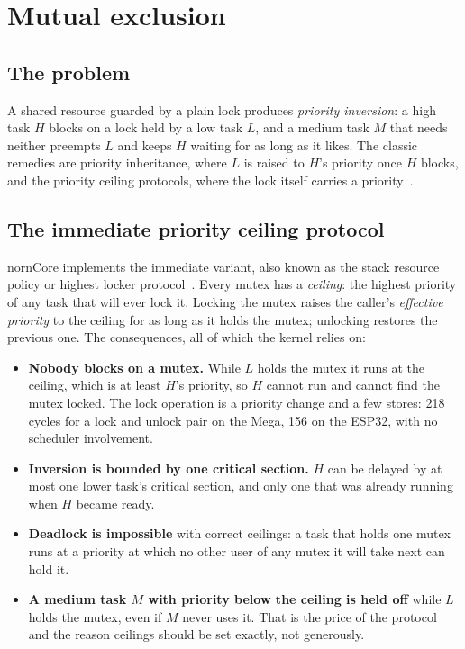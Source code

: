 \section{Mutual exclusion}
\label{sec:mutex}

\subsection{The problem}

A shared resource guarded by a plain lock produces \emph{priority inversion}: a high task
$H$ blocks on a lock held by a low task $L$, and a medium task $M$ that needs neither
preempts $L$ and keeps $H$ waiting for as long as it likes. The classic remedies are
priority inheritance, where $L$ is raised to $H$'s priority once $H$ blocks, and the
priority ceiling protocols, where the lock itself carries a priority~\cite{shaetal}.

\subsection{The immediate priority ceiling protocol}

nornCore implements the immediate variant, also known as the stack resource policy or
highest locker protocol~\cite{baker,burnswellings}. Every mutex has a \emph{ceiling}: the
highest priority of any task that will ever lock it. Locking the mutex raises the
caller's \emph{effective priority} to the ceiling for as long as it holds the mutex;
unlocking restores the previous one. The consequences, all of which the kernel relies
on:

\begin{itemize}
\item \textbf{Nobody blocks on a mutex.} While $L$ holds the mutex it runs at the
  ceiling, which is at least $H$'s priority, so $H$ cannot run and cannot find the mutex
  locked. The lock operation is a priority change and a few stores: 218 cycles for a
  lock and unlock pair on the Mega, 156 on the ESP32, with no scheduler involvement.
\item \textbf{Inversion is bounded by one critical section.} $H$ can be delayed by at
  most one lower task's critical section, and only one that was already running when $H$
  became ready.
\item \textbf{Deadlock is impossible} with correct ceilings: a task that holds one mutex
  runs at a priority at which no other user of any mutex it will take next can hold it.
\item \textbf{A medium task $M$ with priority below the ceiling is held off} while $L$
  holds the mutex, even if $M$ never uses it. That is the price of the protocol and the
  reason ceilings should be set exactly, not generously.
\end{itemize}

